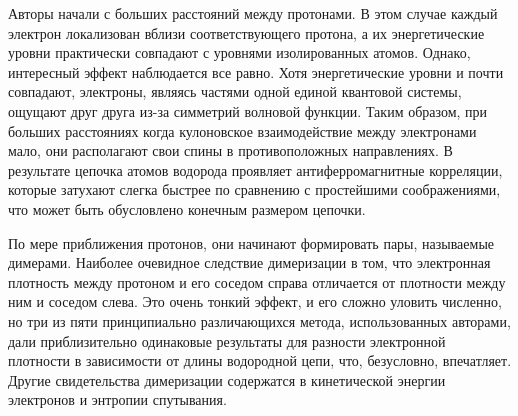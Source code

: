 \documentclass[a4paper, 14pt]{extarticle}
\begin{document}
Авторы начали с больших расстояний между протонами. В этом случае каждый 
электрон локализован вблизи соответствующего протона, а их 
энергетические уровни практически совпадают с уровнями изолированных 
атомов. Однако, интересный эффект наблюдается все равно. Хотя 
энергетические уровни и почти совпадают, электроны, являясь частями 
одной единой квантовой системы, ощущают друг друга из-за симметрий 
волновой функции. Таким образом, при больших расстояниях когда 
кулоновское взаимодействие между электронами мало, они располагают свои 
спины в противоположных направлениях. В результате цепочка атомов 
водорода проявляет антиферромагнитные корреляции, которые затухают 
слегка быстрее по сравнению с простейшими соображениями, что может быть 
обусловлено конечным размером цепочки.



По мере приближения протонов, они начинают формировать пары, называемые 
димерами. Наиболее очевидное следствие димеризации в том, что 
электронная плотность между протоном и его соседом справа отличается от 
плотности между ним и соседом слева. Это очень тонкий эффект, и его 
сложно уловить численно, но три из пяти принципиально различающихся 
метода, использованных авторами, дали приблизительно одинаковые 
результаты для разности электронной плотности в зависимости от длины 
водородной цепи, что, безусловно, впечатляет. Другие свидетельства 
димеризации содержатся в кинетической энергии электронов и энтропии 
спутывания.


\end{document}
